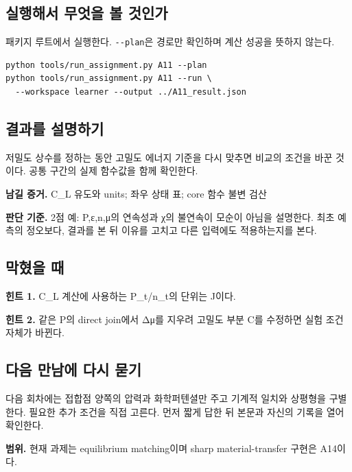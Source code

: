 \documentclass[
  10pt,
  a4paper,
]{article}
\begin{document}
\newpage

\subsection{실행해서 무엇을 볼
것인가}\label{uxc2e4uxd589uxd574uxc11c-uxbb34uxc5c7uxc744-uxbcfc-uxac83uxc778uxac00}

패키지 루트에서 실행한다. \texttt{-\/-plan}은 경로만 확인하며 계산
성공을 뜻하지 않는다.

\begin{verbatim}
python tools/run_assignment.py A11 --plan
python tools/run_assignment.py A11 --run \
  --workspace learner --output ../A11_result.json
\end{verbatim}

\subsection{결과를
설명하기}\label{uxacb0uxacfcuxb97c-uxc124uxba85uxd558uxae30}

저밀도 상수를 정하는 동안 고밀도 에너지 기준을 다시 맞추면 비교의 조건을
바꾼 것이다. 공통 구간의 실제 함수값을 함께 확인한다.

\textbf{남길 증거.} C\_L 유도와 units; 좌우 상태 표; core 함수 불변 검산

\textbf{판단 기준.} 2점 예: P,ε,n,μ의 연속성과 χ의 불연속이 모순이
아님을 설명한다. 최초 예측의 정오보다, 결과를 본 뒤 이유를 고치고 다른
입력에도 적용하는지를 본다.

\subsection{막혔을 때}\label{uxb9c9uxd614uxc744-uxb54c}

\textbf{힌트 1.} C\_L 계산에 사용하는 P\_t/n\_t의 단위는 J이다.

\textbf{힌트 2.} 같은 P의 direct join에서 Δμ를 지우려 고밀도 부분 C를
수정하면 실험 조건 자체가 바뀐다.

\subsection{다음 만남에 다시
묻기}\label{uxb2e4uxc74c-uxb9ccuxb0a8uxc5d0-uxb2e4uxc2dc-uxbb3buxae30}

다음 회차에는 접합점 양쪽의 압력과 화학퍼텐셜만 주고 기계적 일치와
상평형을 구별한다. 필요한 추가 조건을 직접 고른다. 먼저 짧게 답한 뒤
본문과 자신의 기록을 열어 확인한다.

\textbf{범위.} 현재 과제는 equilibrium matching이며 sharp
material-transfer 구현은 A14이다.
\end{document}
